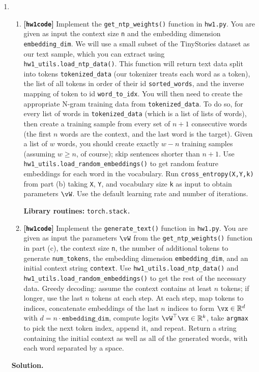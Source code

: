 \documentclass{article}
\def\R{\mathbb{R}}
\def\hwcode{\textbf{[\texttt{hw1code}]}\xspace}
\theoremstyle{definition}
\theoremstyle{remark}
\newenvironment{Q}
{%
  \clearpage
  \item
  }
  {%
    \phantom{s} %
    \bigskip
    \textbf{Solution.}
  }
\begin{document}
\begin{enumerate}[font={\Large\bfseries},left=0pt]
\begin{Q}
\begin{enumerate}
    \item \hwcode Implement the \texttt{get\_ntp\_weights()} function in \texttt{hw1.py}.
    You are given as input the context size \texttt{n} and the embedding dimension \texttt{embedding\_dim}.
    We will use a small subset of the TinyStories dataset \citep{tinystories} as our text sample,
    which you can extract using \texttt{hw1\_utils.load\_ntp\_data()}.
    This function will return text data split into tokens \texttt{tokenized\_data}
    (our tokenizer treats each word as a token),
    the list of all tokens in order of their id \texttt{sorted\_words},
    and the inverse mapping of token to id \texttt{word\_to\_idx}.
    You will then need to create the appropriate N-gram training data from \texttt{tokenized\_data}.
    To do so, for every list of words in \texttt{tokenized\_data} (which is a list of lists of words),
    then create a training sample from every set of $n+1$ consecutive words (the first $n$ words are the context, and the last word is the target).
    Given a list of $w$ words, you should create exactly $w-n$ training samples (assuming $w \geq n$, of course); skip sentences shorter than $n+1$.
    Use \texttt{hw1\_utils.load\_random\_embeddings()} to get random feature embeddings for each word in the vocabulary.
    Run \texttt{cross\_entropy(X,Y,k)} from part (b) taking \texttt{X}, \texttt{Y}, and vocabulary size \texttt{k} as input to obtain parameters $\vW$.
    Use the default learning rate and number of iterations.
    
    \textbf{Library routines:} \texttt{torch.stack.}

    \item \hwcode Implement the \texttt{generate\_text()} function in \texttt{hw1.py}.
    You are given as input the parameters $\vW$ from the \texttt{get\_ntp\_weights()} function in part (c),
    the context size \texttt{n}, the number of additional tokens to generate \texttt{num\_tokens},
    the embedding dimension \texttt{embedding\_dim}, and an initial context string \texttt{context}.
    Use \texttt{hw1\_utils.load\_ntp\_data()} and \texttt{hw1\_utils.load\_random\_embeddings()} to get the rest of the necessary data.
    Greedy decoding: assume the context contains at least $n$ tokens; if longer, use the last $n$ tokens at each step.
    At each step, map tokens to indices, concatenate embeddings of the last $n$ indices to form $\vx\in\R^d$ with $d = n\cdot\texttt{embedding\_dim}$,
    compute logits $\vW^\top \vx \in \R^k$, take \texttt{argmax} to pick the next token index, append it, and repeat.
    Return a string containing the initial context as well as all of the generated words, with each word separated by a space.
    

\end{enumerate}
\end{Q}
\end{enumerate}
\end{document}
